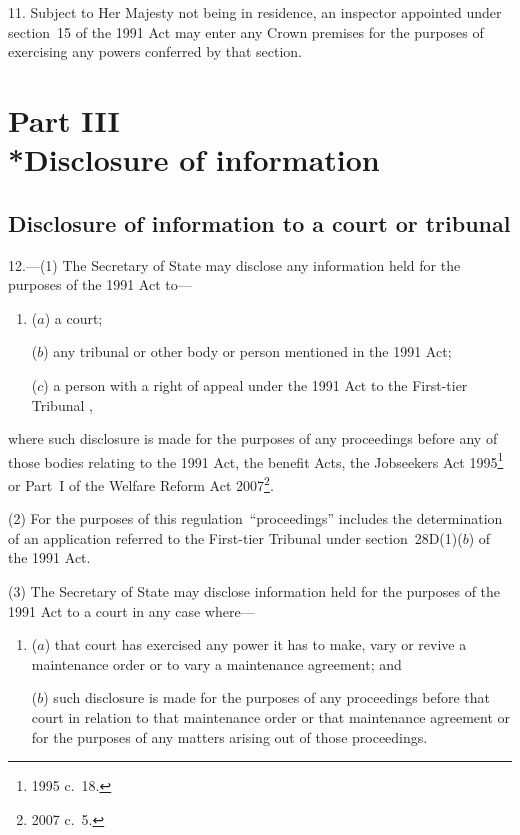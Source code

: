 \documentclass[12pt,a4paper]{article}
\begin{document}
11.  Subject to Her Majesty not being in residence, an inspector appointed under section~15 of the 1991 Act may enter any Crown premises for the purposes of exercising any powers conferred by that section.

\section[Part III --- Disclosure of information]{Part III\\*Disclosure of information}

\renewcommand\parthead{--- Part~III}

\subsection[12. Disclosure of information to a court or tribunal]{Disclosure of information to a court or tribunal}

12.---(1)  The 
Secretary of State  %
may disclose any information held for the purposes of the 1991 Act to—
\begin{enumerate}\item[]
($a$) a court;

($b$) any tribunal or other body or person mentioned in the 1991 Act;

($c$) a person with a right of appeal under the 1991 Act to 
the First-tier Tribunal%
,
\end{enumerate}
where such disclosure is made for the purposes of any proceedings before any of those bodies relating to the 1991 Act, the benefit Acts, the Jobseekers Act 1995\footnote{1995 c.~18.} or Part~I of the Welfare Reform Act 2007\footnote{2007 c.~5.}.

(2) For the purposes of this regulation~“proceedings” includes the determination of an application referred to 
the First-tier Tribunal  %
under section~28D(1)($b$)  of the 1991 Act.

(3) The 
Secretary of State  %
may disclose information held for the purposes of the 1991 Act to a court in any case where—
\begin{enumerate}\item[]
($a$) that court has exercised any power it has to make, vary or revive a maintenance order or to vary a maintenance agreement; and

($b$) such disclosure is made for the purposes of any proceedings before that court in relation to that maintenance order or that maintenance agreement or for the purposes of any matters arising out of those proceedings.
\end{enumerate}
\end{document}
